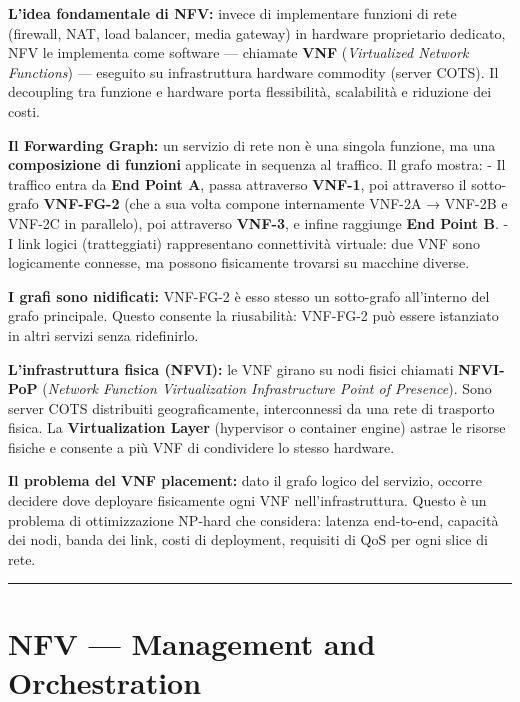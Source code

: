 \documentclass[
  italian,
  openany]{book}
\begin{document}
\textbf{L'idea fondamentale di NFV:} invece di implementare funzioni di
rete (firewall, NAT, load balancer, media gateway) in hardware
proprietario dedicato, NFV le implementa come software --- chiamate
\textbf{VNF} (\emph{Virtualized Network Functions}) --- eseguito su
infrastruttura hardware commodity (server COTS). Il decoupling tra
funzione e hardware porta flessibilità, scalabilità e riduzione dei
costi.

\textbf{Il Forwarding Graph:} un servizio di rete non è una singola
funzione, ma una \textbf{composizione di funzioni} applicate in sequenza
al traffico. Il grafo mostra: - Il traffico entra da \textbf{End Point
A}, passa attraverso \textbf{VNF-1}, poi attraverso il sotto-grafo
\textbf{VNF-FG-2} (che a sua volta compone internamente VNF-2A → VNF-2B
e VNF-2C in parallelo), poi attraverso \textbf{VNF-3}, e infine
raggiunge \textbf{End Point B}. - I link logici (tratteggiati)
rappresentano connettività virtuale: due VNF sono logicamente connesse,
ma possono fisicamente trovarsi su macchine diverse.

\textbf{I grafi sono nidificati:} VNF-FG-2 è esso stesso un sotto-grafo
all'interno del grafo principale. Questo consente la riusabilità:
VNF-FG-2 può essere istanziato in altri servizi senza ridefinirlo.

\textbf{L'infrastruttura fisica (NFVI):} le VNF girano su nodi fisici
chiamati \textbf{NFVI-PoP} (\emph{Network Function Virtualization
Infrastructure Point of Presence}). Sono server COTS distribuiti
geograficamente, interconnessi da una rete di trasporto fisica. La
\textbf{Virtualization Layer} (hypervisor o container engine) astrae le
risorse fisiche e consente a più VNF di condividere lo stesso hardware.

\textbf{Il problema del VNF placement:} dato il grafo logico del
servizio, occorre decidere dove deployare fisicamente ogni VNF
nell'infrastruttura. Questo è un problema di ottimizzazione NP-hard che
considera: latenza end-to-end, capacità dei nodi, banda dei link, costi
di deployment, requisiti di QoS per ogni slice di rete.

\begin{center}\rule{0.5\linewidth}{0.5pt}\end{center}

\section{NFV --- Management and
Orchestration}\label{nfv-management-and-orchestration}
\end{document}
